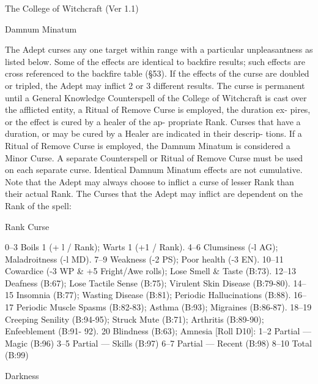 \begin{Chapter}{The College of Witchcraft (Ver 1.1)}
\begin{spell}[G-1]{Damnum Minatum }
\begin{effects}
 The  Adept  curses  any  one  target  within 
range  with  a  particular  unpleasantness  as  listed 
below. Some of the effects are identical to backfire 
results;  such  effects  are  cross  referenced  to  the 
backfire  table  (§53).  If  the  effects  of  the  curse  are 
doubled  or  tripled,  the  Adept  may  inflict  2  or  3 
different  results.  The  curse  is  permanent  until  a 
General Knowledge Counterspell of the College of 
Witchcraft is cast over the afflicted entity, a Ritual 
of  Remove  Curse  is  employed,  the  duration  ex-
pires,  or  the  effect  is  cured  by  a  healer  of  the  ap-
propriate Rank. Curses that have a duration, or may 
be cured by a Healer are indicated in their descrip-
tions. If a Ritual of Remove Curse is employed, the 
Damnum Minatum is considered a Minor Curse. A 
separate  Counterspell  or  Ritual  of  Remove  Curse 
must  be  used  on  each  separate  curse.  Identical 
Damnum  Minatum  effects  are  not  cumulative. 
Note that the Adept may always choose to inflict a 
curse  of  lesser  Rank  than  their  actual  Rank.  The 
Curses that the Adept may inflict are dependent on 
the Rank of the spell: 

Rank Curse 

0–3 Boils 1 (+ l / Rank); Warts 1 (+1 / Rank). 
4–6 Clumsiness (-l AG); Maladroitness (-l MD). 
7–9 Weakness (-2 PS); Poor health (-3 EN). 
10–11 Cowardice (-3 WP \& +5 Fright/Awe rolls); 
Lose Smell \& Taste (B:73). 
12–13 Deafness (B:67); Lose Tactile Sense (B:75); 
Virulent Skin Disease (B:79-80). 
14–15 Insomnia (B:77); Wasting Disease (B:81); 
Periodic Hallucinations (B:88). 
16–17 Periodic Muscle Spasms (B:82-83); Asthma 
(B:93); Migraines (B:86-87). 
18–19 Creeping Senility (B:94-95); Struck Mute 
(B:71); Arthritis (B:89-90); Enfeeblement (B:91-
92). 
20 Blindness (B:63); 
Amnesia [Roll D10]: 
 1–2 Partial — Magic (B:96) 
 3–5 Partial — Skills (B:97) 
 6–7 Partial — Recent (B:98) 
 8–10 Total (B:99) 

\end{effects}
\end{spell}

\begin{spell}[G-2]{Darkness }



\end{spell}
\end{Chapter}
